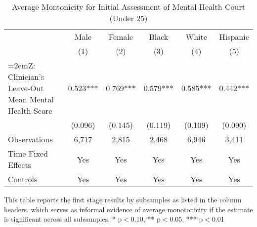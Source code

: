 \begin{table}[htbp]\centering
\small
\caption{Average Montonicity for Initial Assessment of Mental Health Court (Under 25)}\label{tab:avgmono}
\begin{center}
\begin{threeparttable}
\begin{tabular}{p{}*{5}{c}}
\toprule
                    &\multicolumn{1}{c}{Male}&\multicolumn{1}{c}{Female}&\multicolumn{1}{c}{Black}&\multicolumn{1}{c}{White}&\multicolumn{1}{c}{Hispanic}\\\cmidrule(lr){2-2}\cmidrule(lr){3-3}\cmidrule(lr){4-4}\cmidrule(lr){5-5}\cmidrule(lr){6-6}
                    &\multicolumn{1}{c}{(1)}   &\multicolumn{1}{c}{(2)}   &\multicolumn{1}{c}{(3)}   &\multicolumn{1}{c}{(4)}   &\multicolumn{1}{c}{(5)}   \\
\midrule
{\hangindent=2emZ: Clinician's Leave-Out Mean Mental Health Score}&       0.523***&       0.769***&       0.579***&       0.585***&       0.442***\\
                    &     (0.096)   &     (0.145)   &     (0.119)   &     (0.109)   &     (0.090)   \\
\midrule
Observations        &       6,717   &       2,815   &       2,468   &       6,946   &       3,411   \\
Time Fixed Effects  &         Yes   &         Yes   &         Yes   &         Yes   &         Yes   \\
Controls            &         Yes   &         Yes   &         Yes   &         Yes   &         Yes   \\
\bottomrule
\end{tabular}
\tiny
This table reports the first stage results by subsamples as listed in the column headers, which serves as informal evidence of average monotonicity if the estimate is significant across all subsamples. * p$<$0.10, ** p$<$0.05, *** p$<$0.01
\end{threeparttable}
\end{center}
\end{table}
